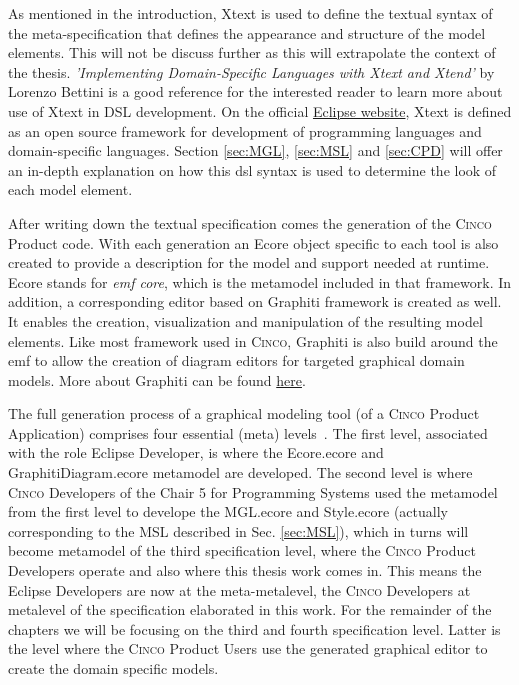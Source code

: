 As mentioned in the introduction, Xtext is used to define the textual syntax of the meta-specification that defines the appearance and structure of the model elements. This will not be discuss further as this will extrapolate the context of the thesis.  \textit{'Implementing Domain-Specific Languages with Xtext and Xtend'} by Lorenzo Bettini is a good reference for the interested reader to learn more about use of Xtext in DSL development. On the official \href{https://www.eclipse.org/Xtext/}{Eclipse website}, Xtext is defined as an open source framework for development of programming languages and domain-specific languages. Section \ref{sec:MGL}, \ref{sec:MSL} and \ref{sec:CPD} will offer an in-depth explanation on how this \acrshort{dsl} syntax is used to determine the look of each model element.

After writing down the textual specification comes the generation of the \textsc{Cinco} Product code. With each generation an Ecore object specific to each tool is also created to provide a description for the model and support needed at runtime. Ecore stands for \textit{\acrfull{emf} core}, which is the metamodel included in that framework. In addition, a corresponding editor based on Graphiti framework is created as well. It enables the creation, visualization and manipulation of the resulting model elements. Like most framework used in \textsc{Cinco}, Graphiti is also build around the \acrshort{emf} to allow the creation of diagram editors for targeted graphical domain models. More about Graphiti can be found \href{https://www.eclipse.org/graphiti/}{here}.

The full generation process of a graphical modeling tool (of a \textsc{Cinco} Product Application) comprises four essential (meta) levels~\cite{Naujokat2018}. The first level, associated with the role Eclipse Developer, is where the Ecore.ecore and GraphitiDiagram.ecore metamodel are developed. The second level is where \textsc{Cinco} Developers of the Chair 5 for Programming Systems used the metamodel from the first level to develope the MGL.ecore and Style.ecore (actually corresponding to the MSL described in Sec. \ref{sec:MSL}), which in turns will become metamodel of the third specification level, where the \textsc{Cinco} Product Developers operate and also where this thesis work comes in. This means the Eclipse Developers are now at the meta-metalevel, the \textsc{Cinco} Developers at metalevel of the specification elaborated in this work. For the remainder of the chapters we will be focusing on the third and fourth specification level. Latter is the level where the \textsc{Cinco} Product Users use the generated graphical editor to create the domain specific models. 

